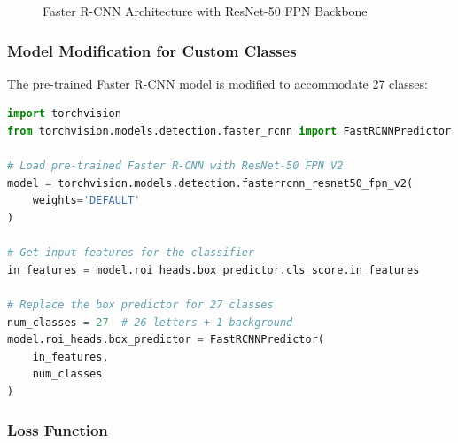 \documentclass[12pt,a4paper]{article}
\begin{document}
\begin{figure}[H]
    \caption{Faster R-CNN Architecture with ResNet-50 FPN Backbone}
    \label{fig:faster_rcnn}
\end{figure}

\subsubsection{Model Modification for Custom Classes}

The pre-trained Faster R-CNN model is modified to accommodate 27 classes:

\begin{lstlisting}[language=python, caption=Model Definition]
import torchvision
from torchvision.models.detection.faster_rcnn import FastRCNNPredictor

# Load pre-trained Faster R-CNN with ResNet-50 FPN V2
model = torchvision.models.detection.fasterrcnn_resnet50_fpn_v2(
    weights='DEFAULT'
)

# Get input features for the classifier
in_features = model.roi_heads.box_predictor.cls_score.in_features

# Replace the box predictor for 27 classes
num_classes = 27  # 26 letters + 1 background
model.roi_heads.box_predictor = FastRCNNPredictor(
    in_features, 
    num_classes
)
\end{lstlisting}

\subsubsection{Loss Function}
\end{document}
